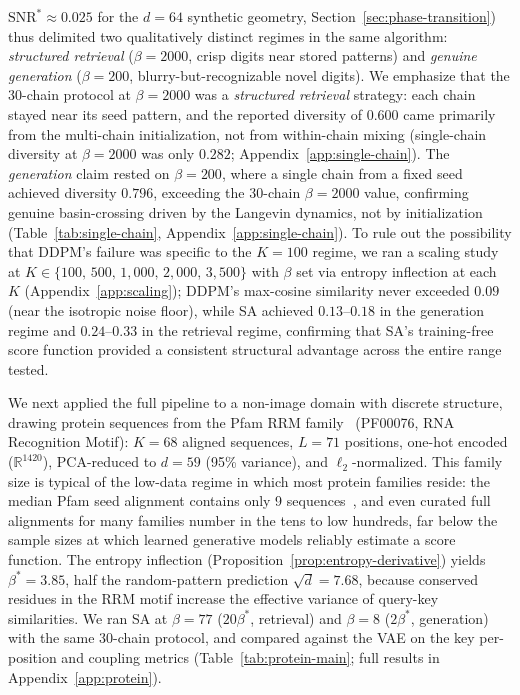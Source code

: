 $\mathrm{SNR}^{*}\approx 0.025$ for the $d{=}64$ synthetic geometry, Section~\ref{sec:phase-transition}) thus delimited two qualitatively distinct regimes in the same algorithm: \emph{structured retrieval} ($\beta{=}2000$, crisp digits near stored patterns) and \emph{genuine generation} ($\beta{=}200$, blurry-but-recognizable novel digits). We emphasize that the 30-chain protocol at $\beta{=}2000$ was a \emph{structured retrieval} strategy: each chain stayed near its seed pattern, and the reported diversity of $0.600$ came primarily from the multi-chain initialization, not from within-chain mixing (single-chain diversity at $\beta{=}2000$ was only $0.282$; Appendix~\ref{app:single-chain}). The \emph{generation} claim rested on $\beta{=}200$, where a single chain from a fixed seed achieved diversity $0.796$, exceeding the 30-chain $\beta{=}2000$ value, confirming genuine basin-crossing driven by the Langevin dynamics, not by initialization (Table~\ref{tab:single-chain}, Appendix~\ref{app:single-chain}). To rule out the possibility that DDPM's failure was specific to the $K{=}100$ regime, we ran a scaling study at $K\in\{100,\,500,\,1{,}000,\,2{,}000,\,3{,}500\}$ with $\beta$ set via entropy inflection at each~$K$ (Appendix~\ref{app:scaling}); DDPM's max-cosine similarity never exceeded $0.09$ (near the isotropic noise floor), while SA achieved $0.13$--$0.18$ in the generation regime and $0.24$--$0.33$ in the retrieval regime, confirming that SA's training-free score function provided a consistent structural advantage across the entire range tested.

We next applied the full pipeline to a non-image domain with discrete structure, drawing protein sequences from the Pfam RRM family~\cite{mistryPfamProteinFamilies2021} (PF00076, RNA Recognition Motif): $K{=}68$ aligned sequences, $L{=}71$ positions, one-hot encoded ($\mathbb{R}^{1420}$), PCA-reduced to $d{=}59$ (95\% variance), and $\ell_2$-normalized. This family size is typical of the low-data regime in which most protein families reside: the median Pfam seed alignment contains only 9 sequences~\cite{finnPfamProteinFamilies2008}, and even curated full alignments for many families number in the tens to low hundreds, far below the sample sizes at which learned generative models reliably estimate a score function. The entropy inflection (Proposition~\ref{prop:entropy-derivative}) yields $\beta^*{=}3.85$, half the random-pattern prediction $\sqrt{d}{=}7.68$, because conserved residues in the RRM motif increase the effective variance of query-key similarities. We ran SA at $\beta{=}77$ ($20\beta^*$, retrieval) and $\beta{=}8$ ($2\beta^*$, generation) with the same 30-chain protocol, and compared against the VAE on the key per-position and coupling metrics (Table~\ref{tab:protein-main}; full results in Appendix~\ref{app:protein}).


